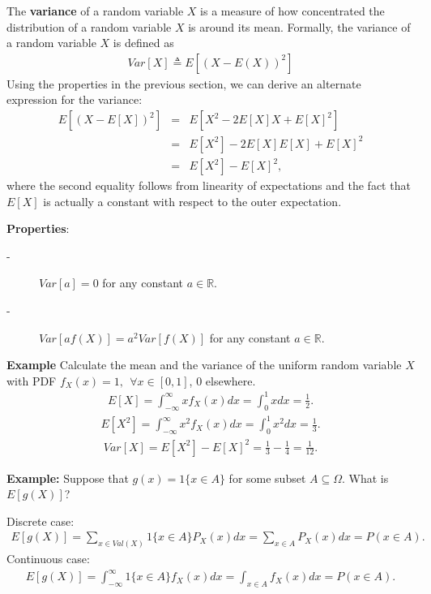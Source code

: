 \documentclass{article}
\begin{document}
The \textbf{variance} of a random variable $X$ is a measure of how concentrated the distribution of a random variable $X$
is around its mean.  Formally, the variance of a random variable $X$ is defined as
\begin{align*}
  Var[X] \triangleq E[(X-E(X))^2]
\end{align*}
Using the properties in the previous section, we can derive an alternate expression for the variance:
\begin{eqnarray*}
  E[(X - E[X])^2] &=& E[X^2 - 2E[X] X + E[X]^2] \\ &=& E[X^2] - 2 E[X] E[X] + E[X]^2 \\ &=& E[X^2] - E[X]^2,
\end{eqnarray*}
where the second equality follows from linearity of expectations and the fact that $E[X]$ is actually a constant with
respect to the outer expectation.  

\textbf{Properties}:
\begin{description}
\item[-] $Var[a] = 0$ for any constant $a \in \mathbb{R}$.
\item[-] $Var[a f(X)] = a^2 Var[f(X)]$ for any constant $a \in \mathbb{R}$.
\end{description}

\textbf{Example} Calculate the mean and the variance of the uniform random variable $X$ with PDF $f_X(x)=1, \ \ \forall x \in [0,1]$, 0 elsewhere.
\begin{align*}
E[X]= \int_{-\infty}^{\infty} xf_X(x) dx= \int_{0}^{1}xdx=\frac{1}{2}. \nonumber
\end{align*}
\begin{align*}
E[X^2]=\int_{-\infty}^{\infty} x^2f_X(x) dx= \int_{0}^{1}x^2dx=\frac{1}{3}. \nonumber
\end{align*}
\begin{align*} 
Var[X]=E[X^2]-E[X]^2= \frac{1}{3}- \frac{1}{4}=\frac{1}{12}. \nonumber
\end{align*}

\textbf{Example:} Suppose that $g(x)= 1\{x \in A\}$ for some subset $A \subseteq \Omega$.
What is $E[g(X)]$? 

Discrete case: 
\begin{align*}
  E[g(X)]= \sum_{x \in Val(X)} 1\{x \in A\} P_X(x)dx= \sum_{x \in A} P_X(x)dx= P(x \in A). \nonumber
\end{align*}
Continuous case: 
\begin{align*}
  E[g(X)]= \int_{-\infty}^{\infty} 1\{x \in A\} f_X(x)dx= \int_{x \in A} f_X(x)dx= P(x \in A). \nonumber
\end{align*}
\end{document}
